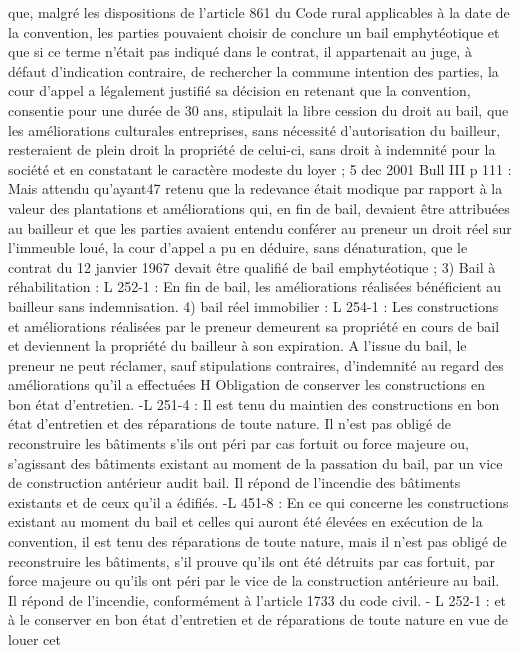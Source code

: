 \documentclass[11pt,a4paper]{report}
\begin{document}
	que, malgré les dispositions de l'article 861 du Code rural applicables à la date de la convention, les parties
	pouvaient choisir de conclure un bail emphytéotique et que si ce terme n'était pas indiqué dans le contrat, il
	appartenait au juge, à défaut d'indication contraire, de rechercher la commune intention des parties, la cour
	d'appel a légalement justifié sa décision en retenant que la convention, consentie pour une durée de 30 ans,
	stipulait la libre cession du droit au bail, que les améliorations culturales entreprises, sans nécessité
	d'autorisation du bailleur, resteraient de plein droit la propriété de celui-ci, sans droit à indemnité pour la
	société et en constatant le caractère modeste du loyer ; 5 dec 2001 Bull III  p 111 : Mais attendu qu'ayant47
	retenu que la redevance était modique par rapport à la valeur des plantations et améliorations qui, en fin de
	bail, devaient être attribuées au bailleur et que les parties avaient entendu conférer au preneur un droit réel sur
	l'immeuble loué, la cour d'appel a pu en déduire, sans dénaturation, que le contrat du 12 janvier 1967 devait
	être qualifié de bail emphytéotique ;
	3) Bail à réhabilitation : L 252-1 : En fin de bail, les améliorations réalisées bénéficient au bailleur sans
	indemnisation.
	4) bail réel immobilier : L 254-1 : Les constructions et améliorations réalisées par le preneur demeurent sa
	propriété en cours de bail et deviennent la propriété du bailleur à son expiration. A l'issue du bail, le preneur ne
	peut réclamer, sauf stipulations contraires, d'indemnité au regard des améliorations qu'il a effectuées
	H Obligation de conserver les constructions en bon état d’entretien.
	-L 251-4 : Il est tenu du maintien des constructions en bon état d'entretien et des réparations de toute nature. Il
	n'est pas obligé de reconstruire les bâtiments s'ils ont péri par cas fortuit ou force majeure ou, s'agissant des
	bâtiments existant au moment de la passation du bail, par un vice de construction antérieur audit bail. Il répond
	de l'incendie des bâtiments existants et de ceux qu'il a édifiés.
	-L 451-8 : En ce qui concerne les constructions existant au moment du bail et celles qui auront été élevées en
	exécution de la convention, il est tenu des réparations de toute nature, mais il n'est pas obligé de reconstruire les
	bâtiments, s'il prouve qu'ils ont été détruits par cas fortuit, par force majeure ou qu'ils ont péri par le vice de la
	construction antérieure au bail. Il répond de l'incendie, conformément à l'article 1733 du code civil.
	- L 252-1 : et à le conserver en bon état d'entretien et de réparations de toute nature en vue de louer cet
\end{document}
